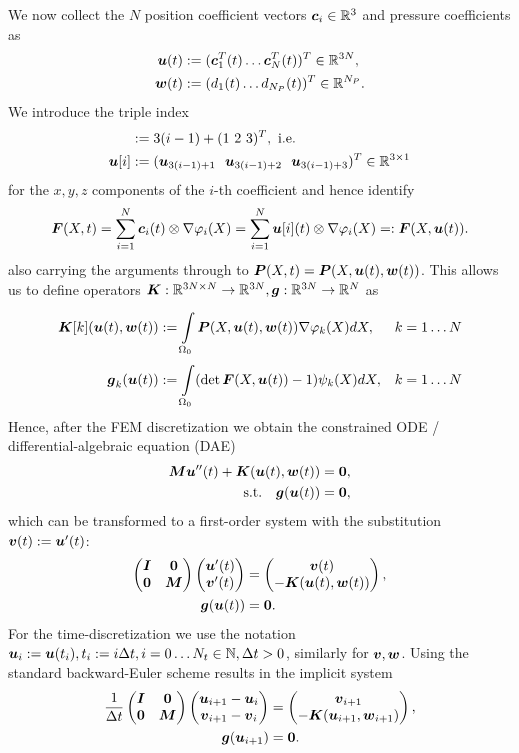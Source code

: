 We now collect the $N$ position coefficient vectors $\vc_i \in\R^3$ and pressure coefficients as
\begin{align*}
	\vu(t) &:= (\vc_1^T(t) \ldots \vc_N^T(t))^T \in\R^{3N},\\
	\vw(t) &:= (d_1(t) \ldots d_{N_P}(t))^T \in\R^{N_P}.
\end{align*}
We introduce the triple index
\begin{align}
	[i] &:= 3(i-1)+(1~2~3)^T, \text{ i.e.}\\
	\vu[i] &:= (\vu_{3(i-1)+1}~~\vu_{3(i-1)+2}~~\vu_{3(i-1)+3})^T\in\R^{3\times 1}
\end{align}
for the $x,y,z$ components of the $i$-th coefficient and hence identify
\[
	\vF(X,t) = \sumi \vc_i(t)\otimes \nabla\varphi_i(X) = \sumi \vu[i](t)\otimes \nabla\varphi_i(X) =: \vF(X,\vu(t)).
\]
also carrying the arguments through to $\vP(X,t) = \vP(X,\vu(t),\vw(t))$.
This allows us to define operators $\vK: \R^{3N\times N}\to\R^{3N}, \vg:\R^{3N}\to\R^N$ as
\begin{align}
	\vK[k](\vu(t),\vw(t)) &:= \intor\vP(X,\vu(t),\vw(t))\dpk dX, && k=1\ldots N\\
	\vg_k(\vu(t)) &:= \intor (\det\vF(X,\vu(t))-1)\psi_k(X)dX, && k=1\ldots N
\end{align}
Hence, after the FEM discretization we obtain the constrained ODE / differential-algebraic equation (DAE)
\begin{align}
	\vM\vu''(t) + \vK(\vu(t),\vw(t)) &= \vnull,\\
		\text{s.t.}\quad \vg(\vu(t))		&= \vnull,
\end{align}
which can be transformed to a first-order system with the substitution $\vv(t) := \vu'(t)$:
\begin{align}
	\m{\vI & \vnull\\ \vnull & \vM}\m{\vu'(t)\\ \vv'(t)} &= \m{\vv(t) \\ -\vK(\vu(t),\vw(t))},\\
	\vg(\vu(t))		&= \vnull.
\end{align}
For the time-discretization we use the notation $\vu_i := \vu(t_i), t_i := i\Delta t, i=0\ldots N_t\in\N, \Delta t > 0$, similarly for $\vv,\vw$.
Using the standard backward-Euler scheme results in the implicit system
\begin{align}
	\frac{1}{\Delta t}\m{\vI & \vnull\\ \vnull & \vM}\m{\vu_{i+1}-\vu_i\\\vv_{i+1}-\vv_i} &= \m{\vv_{i+1}\\-\vK(\vu_{i+1},\vw_{i+1})},\\
	\vg(\vu_{i+1})		&= \vnull.
\end{align}
